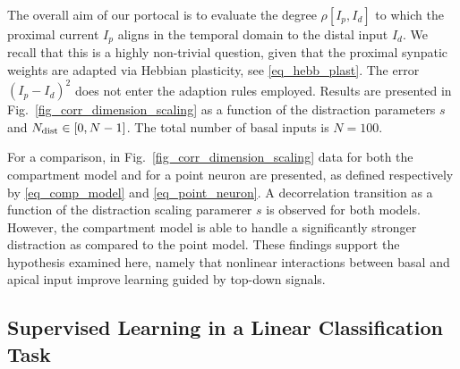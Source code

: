 \documentclass[utf8]{frontiersSCNS} %
\begin{document}
The overall aim of our portocal is to evaluate
the degree $\rho[I_p,I_d]$ to which
the proximal current $I_p$ aligns in the
temporal domain to the distal input $I_d$.
We recall that this is a highly non-trivial
question, given that the proximal synpatic
weights are adapted via Hebbian plasticity, 
see \eqref{eq_hebb_plast}. The error 
$(I_p-I_d)^2$ does not
enter the adaption rules employed.
Results are presented in
Fig.~\ref{fig_corr_dimension_scaling}
as a function of the distraction parameters 
$s$ and $N_{\rm dist}\in[0,N-1]$. The
total number of basal inputs is $N=100$.

For a comparison, in 
Fig.~\ref{fig_corr_dimension_scaling}
data for both the compartment model
and for a point neuron are presented,
as defined respectively by \eqref{eq_comp_model}
and \eqref{eq_point_neuron}. A decorrelation 
transition as a function of the distraction 
scaling paramerer $s$ is observed for both 
models. However, the compartment model is able
to handle a significantly stronger distraction 
as compared to the point model. These findings
support the hypothesis examined here, namely
that nonlinear interactions between basal and 
apical input improve learning guided by top-down signals.

\subsection{Supervised Learning in a Linear Classification Task}
\label{sect:classification}
\end{document}
